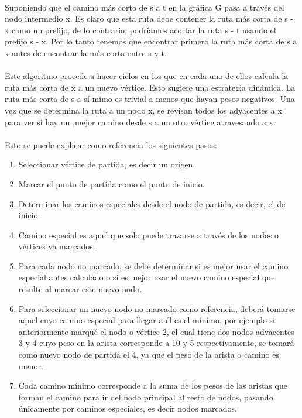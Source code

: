 \documentclass[11pt]{article}
\begin{document}
\paragraph{}
Suponiendo que el camino más corto de s a t en la gráfica G pasa a través del nodo intermedio x. Es claro que esta ruta debe contener la ruta más corta de s - x como un prefijo, de lo contrario, podríamos acortar la ruta s - t usando el prefijo s - x. Por lo tanto tenemos que encontrar primero la ruta más corta de s a x antes de encontrar la más corta entre s y t. 

\paragraph{}
Este algoritmo procede a hacer ciclos en los que en cada uno de ellos calcula la ruta más corta de x a un nuevo vértice. Esto sugiere una estrategia dinámica. La ruta más corta de s a sí mimo es trivial a menos que hayan pesos negativos. Una vez que se determina la ruta a un nodo x, se revisan todos los adyacentes a x para ver si hay un ,mejor camino desde s a un otro vértice atravesando a x.

\paragraph{}
Esto se puede explicar como referencia los siguientes pasos:

\begin{enumerate}
\item Seleccionar vértice de partida, es decir un origen.
\item Marcar el punto de partida como el punto de inicio.
\item Determinar los caminos especiales desde el nodo de partida, es decir, el de inicio.
\item Camino especial es aquel que solo puede trazarse a través de los nodos o vértices ya marcados.
\item Para  cada  nodo  no  marcado,  se  debe  determinar  si  es  mejor  usar  el  camino  especial antes calculado o si es mejor usar el nuevo camino especial que resulte al marcar este nuevo nodo.
\item Para  seleccionar  un  nuevo  nodo  no  marcado  como  referencia,  deberá  tomarse  aquel cuyo camino especial para llegar a él es el mínimo, por ejemplo si anteriormente marqué el  nodo  o  vértice  2,  el  cual  tiene  dos  nodos  adyacentes  3  y  4  cuyo  peso  en  la  arista corresponde a 10 y 5 respectivamente, se tomará como nuevo nodo de partida el 4, ya que el peso de la arista o camino es menor.
\item Cada camino mínimo corresponde a la suma de los pesos de las aristas que forman el camino para  ir  del  nodo  principal  al  resto  de  nodos,  pasando  únicamente  por  caminos especiales, es decir nodos marcados.
\end{enumerate}
\end{document}
